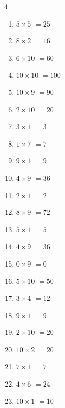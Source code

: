 \begin{multicols}{4}
\begin{enumerate}
  \item $5\times 5$
        $=25$

  \item $8\times 2$
        $=16$

  \item $6\times 10$
        $=60$

  \item $10\times 10$
        $=100$

  \item $10\times 9$
        $=90$

  \item $2\times 10$
        $=20$

  \item $3\times 1$
        $=3$

  \item $1\times 7$
        $=7$

  \item $9\times 1$
        $=9$

  \item $4\times 9$
        $=36$

  \item $2\times 1$
        $=2$

  \item $8\times 9$
        $=72$

  \item $5\times 1$
        $=5$

  \item $4\times 9$
        $=36$

  \item $0\times 9$
        $=0$

  \item $5\times 10$
        $=50$

  \item $3\times 4$
        $=12$

  \item $9\times 1$
        $=9$

  \item $2\times 10$
        $=20$

  \item $10\times 2$
        $=20$

  \item $7\times 1$
        $=7$

  \item $4\times 6$
        $=24$

  \item $10\times 1$
        $=10$


\end{enumerate}
\end{multicols}
